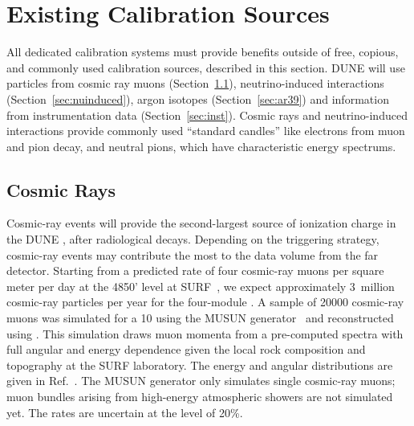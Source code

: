 

\section{Existing Calibration Sources} \label{sec:existsource}

All dedicated calibration systems must provide benefits outside of free, copious, and commonly used calibration sources, described in this section. DUNE will use particles from cosmic ray muons (Section~\ref{sec:cr}), neutrino-induced interactions (Section~\ref{sec:nuinduced}),  argon isotopes (Section~\ref{sec:ar39}) and information from instrumentation data  (Section~\ref{sec:inst}). Cosmic rays and neutrino-induced interactions provide commonly used ``standard candles'' like electrons from muon and pion decay, and neutral pions, which have characteristic energy spectrums. 

\subsection{Cosmic Rays }\label{sec:cr}

Cosmic-ray events will provide the second-largest source of ionization charge in the DUNE ,
after radiological decays.  Depending on the triggering strategy, cosmic-ray events may contribute the
most to the data volume from the far detector.  Starting from a predicted rate of four cosmic-ray muons
per square meter per day at the 4850' level at SURF~\cite{LBNEDOCDB9673}, we expect 
approximately \num{3}~million cosmic-ray particles per year for the four-module .
A sample of \num{20000} cosmic-ray muons was simulated for a %
\SI{10}{\kt}  using the MUSUN
generator~\cite{Kudryavtsev:2008qh} and reconstructed using .  This simulation draws muon
momenta from a pre-computed spectra with full angular and energy dependence given the local rock
composition and topography at the SURF laboratory.  The energy and angular distributions are given
in Ref.~\cite{LBNEDOCDB9673}.  The MUSUN generator only simulates single cosmic-ray muons;
muon bundles arising from high-energy atmospheric showers are not simulated yet.
The rates are uncertain at the level of 20\%.

